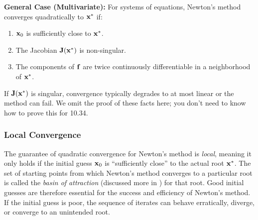 \textbf{General Case (Multivariate):}
For systems of equations, Newton's method converges quadratically to $\mathbf{x}^*$ if:
\begin{enumerate}
    \item $\mathbf{x}_0$ is sufficiently close to $\mathbf{x}^*$.
    \item The Jacobian $\mathbf{J}(\mathbf{x}^*)$ is non-singular.
    \item The components of $\mathbf{f}$ are twice continuously differentiable in a neighborhood of $\mathbf{x}^*$.
\end{enumerate}
If $\mathbf{J}(\mathbf{x}^*)$ is singular, convergence typically degrades to at most linear or the method can fail. We omit the proof of these facts here; you don't need to know how to prove this for 10.34.

\subsubsection{Local Convergence}
The guarantee of quadratic convergence for Newton's method is \textit{local}, meaning it only holds if the initial guess $\mathbf{x}_0$ is ``sufficiently close'' to the actual root $\mathbf{x}^*$. The set of starting points from which Newton's method converges to a particular root is called the \textit{basin of attraction} (discussed more in ) for that root. Good initial guesses are therefore essential for the success and efficiency of Newton's method. If the initial guess is poor, the sequence of iterates can behave erratically, diverge, or converge to an unintended root.


